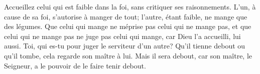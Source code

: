 Accueillez celui qui est faible dans la foi,
	sans critiquer ses raisonnements.
L’un, à cause de sa foi, s’autorise à manger de tout;
	l’autre, étant faible, ne mange que des légumes.
Que celui qui mange ne méprise pas celui qui ne mange pas,
	et que celui qui ne mange pas ne juge pas celui qui mange,
	car Dieu l’a accueilli, lui aussi.
Toi, qui es-tu pour juger le serviteur d’un autre?
	Qu’il tienne debout ou qu’il tombe, cela regarde son maître à lui.
Mais il sera debout,
	car son maître, le Seigneur, a le pouvoir de le faire tenir debout.
